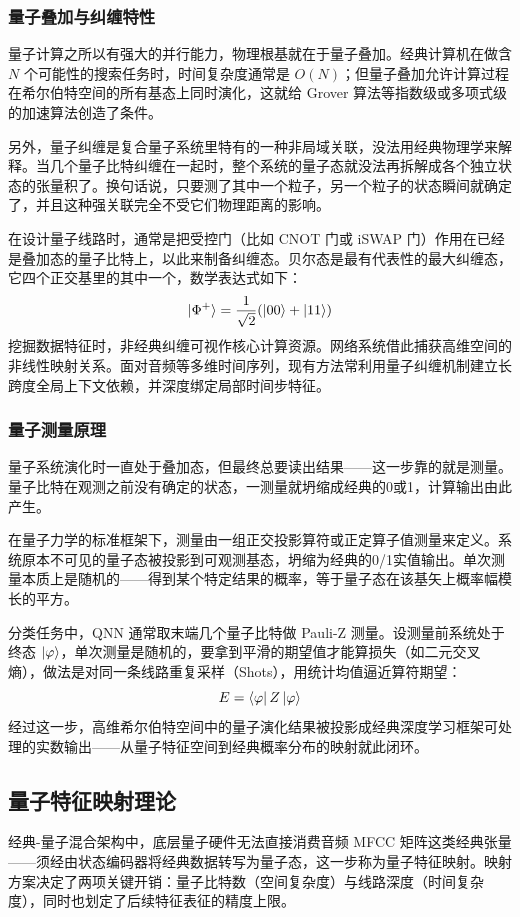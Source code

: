\subsubsection{量子叠加与纠缠特性}
量子计算之所以有强大的并行能力，物理根基就在于量子叠加。经典计算机在做含 $N$ 个可能性的搜索任务时，时间复杂度通常是 $O(N)$；但量子叠加允许计算过程在希尔伯特空间的所有基态上同时演化，这就给 Grover 算法等指数级或多项式级的加速算法创造了条件。

另外，量子纠缠是复合量子系统里特有的一种非局域关联，没法用经典物理学来解释。当几个量子比特纠缠在一起时，整个系统的量子态就没法再拆解成各个独立状态的张量积了。换句话说，只要测了其中一个粒子，另一个粒子的状态瞬间就确定了，并且这种强关联完全不受它们物理距离的影响。

在设计量子线路时，通常是把受控门（比如 CNOT 门或 iSWAP 门）作用在已经是叠加态的量子比特上，以此来制备纠缠态。贝尔态是最有代表性的最大纠缠态，它四个正交基里的其中一个，数学表达式如下：
\begin{equation}
	\ket{\Phi^{+}} = \frac{1}{\sqrt{2}} (\ket{00} + \ket{11})
\end{equation}
挖掘数据特征时，非经典纠缠可视作核心计算资源。网络系统借此捕获高维空间的非线性映射关系。面对音频等多维时间序列，现有方法常利用量子纠缠机制建立长跨度全局上下文依赖，并深度绑定局部时间步特征。
\subsubsection{量子测量原理}
量子系统演化时一直处于叠加态，但最终总要读出结果——这一步靠的就是测量。量子比特在观测之前没有确定的状态，一测量就坍缩成经典的0或1，计算输出由此产生。

在量子力学的标准框架下，测量由一组正交投影算符或正定算子值测量来定义。系统原本不可见的量子态被投影到可观测基态，坍缩为经典的0/1实值输出。单次测量本质上是随机的——得到某个特定结果的概率，等于量子态在该基矢上概率幅模长的平方。

分类任务中，QNN 通常取末端几个量子比特做 Pauli-Z 测量。设测量前系统处于终态 $\ket{\varphi}$，单次测量是随机的，要拿到平滑的期望值才能算损失（如二元交叉熵），做法是对同一条线路重复采样（Shots），用统计均值逼近算符期望：
\begin{equation}
	E 
	= \bra{\varphi} Z \ket{\varphi}
\end{equation}
经过这一步，高维希尔伯特空间中的量子演化结果被投影成经典深度学习框架可处理的实数输出——从量子特征空间到经典概率分布的映射就此闭环。

\subsection{量子特征映射理论}
经典-量子混合架构中，底层量子硬件无法直接消费音频 MFCC 矩阵这类经典张量——须经由状态编码器将经典数据转写为量子态，这一步称为量子特征映射。映射方案决定了两项关键开销：量子比特数（空间复杂度）与线路深度（时间复杂度），同时也划定了后续特征表征的精度上限。

